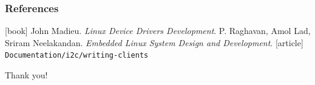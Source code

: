 \begin{frame}
  \frametitle{References}
  \begin{thebibliography}{}
  [book]
    John Madieu.
    \newblock \emph{Linux Device Drivers Development}.
    P. Raghavan, Amol Lad, Sriram Neelakandan.
    \newblock \emph{Embedded Linux System Design and Development}.
  [article]
   \texttt{Documentation/i2c/writing-clients}
  \end{thebibliography}
\end{frame}

\begin{frame}[standout]
  Thank you!
\end{frame}



